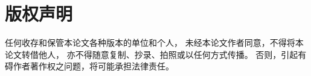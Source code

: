 \chapter*{版权声明}
\thispagestyle{empty}

任何收存和保管本论文各种版本的单位和个人，
未经本论文作者同意，不得将本论文转借他人，
亦不得随意复制、抄录、拍照或以任何方式传播。
否则，引起有碍作者著作权之问题，将可能承担法律责任。

